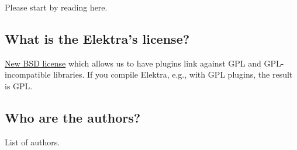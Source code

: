 Please start by reading here.

\subsection*{What is the Elektra's license?}

\hyperlink{doc_LICENSE_md}{New B\+S\+D license} which allows us to have plugins link against G\+P\+L and G\+P\+L-\/incompatible libraries. If you compile Elektra, e.\+g., with G\+P\+L plugins, the result is G\+P\+L.

\subsection*{Who are the authors?}

List of authors. 